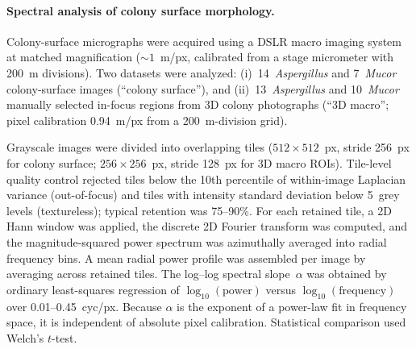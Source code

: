 
\paragraph{Spectral analysis of colony surface morphology.}
Colony-surface micrographs were acquired using a DSLR macro
imaging system at matched magnification (${\sim}1$~\textmu m/px,
calibrated from a stage micrometer with 200~\textmu m divisions).
Two datasets were analyzed: (i)~14~\textit{Aspergillus} and
7~\textit{Mucor} colony-surface images (``colony surface''), and
(ii)~13~\textit{Aspergillus} and 10~\textit{Mucor} manually
selected in-focus regions from 3D colony photographs
(``3D macro''; pixel calibration 0.94~\textmu m/px from a
200~\textmu m-division grid).

Grayscale images were divided into overlapping tiles
($512 \times 512$~px, stride 256~px for colony surface;
$256 \times 256$~px, stride 128~px for 3D macro ROIs).
Tile-level quality control rejected tiles below the 10th
percentile of within-image Laplacian variance (out-of-focus) and
tiles with intensity standard deviation below 5~grey levels
(textureless); typical retention was 75--90\%.  For each retained
tile, a 2D Hann window was applied, the discrete 2D Fourier
transform was computed, and the magnitude-squared power spectrum
was azimuthally averaged into radial frequency bins.  A mean
radial power profile was assembled per image by averaging across
retained tiles.  The log--log spectral slope~$\alpha$ was
obtained by ordinary least-squares regression of
$\log_{10}(\mathrm{power})$ versus
$\log_{10}(\mathrm{frequency})$ over 0.01--0.45~cyc/px.
Because $\alpha$ is the exponent of a power-law fit in frequency
space, it is independent of absolute pixel calibration.
Statistical comparison used Welch's $t$-test.



